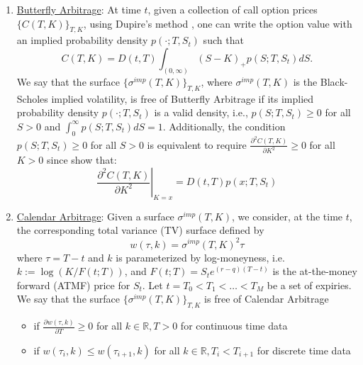 \documentclass[letterpaper,12pt,titlepage,oneside,final]{book}
\numberwithin{equation}{section}
\theoremstyle{definition}
\begin{document}
\begin{enumerate}
	\item  \label{item:butterfly}\underline{Butterfly Arbitrage}: At time $t$, given a collection of call option prices $\{C(T,K)\}_{T,K}$, using Dupire's method \cite{dupire1994pricing}, one can write the option value with  an implied probability density $ p(\cdot;T,S_t) $ such that 
	\[
	C(T,K) = D(t,T) \int_{(0,\infty)} (S - K)_+ p(S;T,S_t) dS.
	\]
	We say that the surface $\{ \sigma^{imp}(T,K) \}_{T,K}$, where $\sigma^{imp}(T,K)$ is the Black-Scholes implied volatility, is free of Butterfly Arbitrage if its implied probability density $p(\cdot ; T,S_t)$ is a valid density, i.e., $p(S;T,S_t) \geq 0$ for all $S > 0$ and $\int_{0}^{\infty} p(S;T,S_t) dS = 1$. 
	Additionally, the condition $p(S;T,S_t) \geq 0$ for all $S > 0$ is equivalent to require $\frac{\partial^2 C(T,K)}{\partial K^2} \geq 0$ for all $K > 0$ since 
	\citet{breeden1978prices} show that:
	\[
	\left. \frac{\partial^2 C(T,K)}{\partial K^2} \right\vert_{K=x}=D(t,T)	p(x;T,S_t)
	\]
	
	
	\item \label{item:calendar} \underline{Calendar Arbitrage}:
	Given a surface $\sigma^{imp}(T,K)$, we consider, at the time $t$, the corresponding total variance (TV) surface defined by 
	\[
	w(\tau,k) = \sigma^{imp}(T,K)^2 \tau
	\]
	where $\tau =T-t$ and $k$ is parameterized by log-moneyness, i.e. $k := \log(K/F(t;T))$, and $F(t;T)=S_te^{(r-q)(T-t)}$ is the at-the-money forward (ATMF) price for $S_t$. Let $t=T_0 < T_1 < \dots< T_{M} $ be a set of expiries. We say that the surface $\{ \sigma^{imp}(T,K) \}_{T,K}$ is free of Calendar Arbitrage 
	\begin{itemize}
		\item if $\frac{\partial w(\tau,k)}{\partial T} \geq 0 $ for all $k \in \mathbb{R}, T > 0$ for continuous time data
		\item if $w(\tau_i,k) \leq w(\tau_{i+1},k)$ for all $k \in \mathbb{R},  T_{i} < T_{i+1}$ for discrete time data 
	\end{itemize}
	

\end{enumerate}
\end{document}
